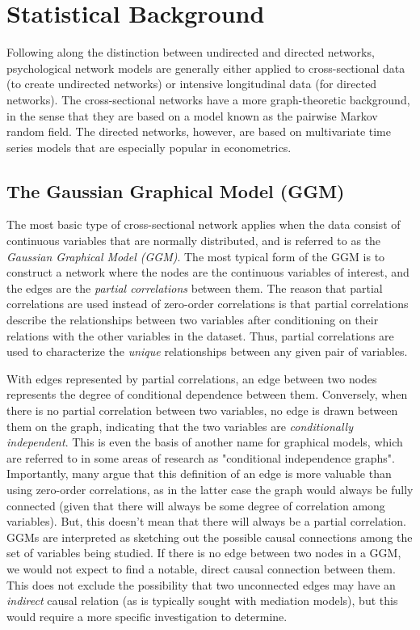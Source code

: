 \section{Statistical Background}
Following along the distinction between undirected and directed networks, psychological network models are generally either applied to cross-sectional data (to create undirected networks) or intensive longitudinal data (for directed networks). The cross-sectional networks have a more graph-theoretic background, in the sense that they are based on a model known as the pairwise Markov random field. The directed networks, however, are based on multivariate time series models that are especially popular in econometrics.

\subsection{The Gaussian Graphical Model (GGM)}
The most basic type of cross-sectional network applies when the data consist of continuous variables that are normally distributed, and is referred to as the \textit{Gaussian Graphical Model (GGM)}. The most typical form of the GGM is to construct a network where the nodes are the continuous variables of interest, and the edges are the \textit{partial correlations} between them. The reason that partial correlations are used instead of zero-order correlations is that partial correlations describe the relationships between two variables after conditioning on their relations with the other variables in the dataset. Thus, partial correlations are used to characterize the \textit{unique} relationships between any given pair of variables. 

With edges represented by partial correlations, an edge between two nodes represents the degree of conditional dependence between them. Conversely, when there is no partial correlation between two variables, no edge is drawn between them on the graph, indicating that the two variables are \textit{conditionally independent}. This is even the basis of another name for graphical models, which are referred to in some areas of research as "conditional independence graphs". Importantly, many argue that this definition of an edge is more valuable than using zero-order correlations, as in the latter case the graph would always be fully connected (given that there will always be some degree of correlation among variables). But, this doesn't mean that there will always be a partial correlation. GGMs are interpreted as sketching out the possible causal connections among the set of variables being studied. If there is no edge between two nodes in a GGM, we would not expect to find a notable, direct causal connection between them. This does not exclude the possibility that two unconnected edges may have an \textit{indirect} causal relation (as is typically sought with mediation models), but this would require a more specific investigation to determine.

